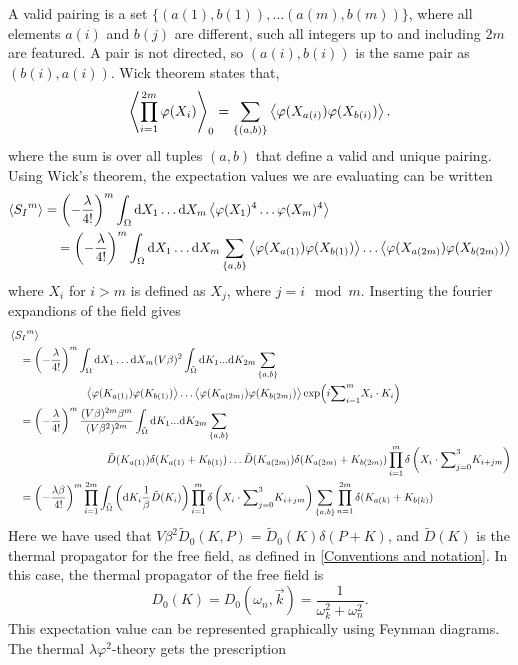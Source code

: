 A valid pairing is a set $\{(a(1), b(1)), \dots (a(m), b(m))\}$, where all elements $a(i)$ and $b(j)$ are different, such all integers up to and including $2m$ are featured.
A pair is not directed, so $(a(i), b(i))$ is the same pair as $(b(i), a(i))$.
Wick theorem states that,
\begin{equation}
    \ex{\prod_{i=1}^{2m} \varphi(X_i)  }_0
    = \sum_{\{(a, b)\}} \ex{\varphi(X_{a(i)}) \varphi(X_{b(i)})}.
\end{equation}
where the  sum is over all tuples $(a, b)$ that define a valid and unique pairing.
Using Wick's theorem, the expectation values we are evaluating can be written
\begin{align*}
    \ex{{S_I}^m} & 
    = \left(- \frac{\lambda }{4!}\right)^m 
    \int_{\Omega} \dd X_1 \dots \dd X_m
    \ex{\varphi(X_1)^4 \dots \varphi(X_m)^4} \\ 
    & \quad
    = \left(- \frac{\lambda }{4!}\right)^m 
    \int_{\Omega} \dd X_1 \dots \dd X_m \sum_{\{a, b\}}
    \ex{\varphi(X_{a(1)}) \varphi(X_{b(1)})} 
    \dots
    \ex{\varphi(X_{a(2m)}) \varphi(X_{b(2m)})}
\end{align*}
where $X_i$ for $i>m$ is defined as $X_j$, where $j = i \mod m$.
Inserting the fourier expandions of the field gives
\begin{align*}
    & \ex{{S_I}^m} \\ 
    &\quad 
    = \left(-\frac{\lambda }{4!}\right)^m 
    \int_{\Omega} \dd X_1 \dots \dd X_m
    (V \beta)^2 \int_{\tilde \Omega} \dd K_1 ... \dd K_{2m} \sum_{\{a, b\}} \\
    & \quad \quad \quad \quad\quad \quad \quad
    \ex{\varphi(K_{a(1)}) \varphi(K_{b(1)})} 
    \dots
    \ex{\varphi(K_{a(2m)}) \varphi(K_{b(2m)})}     
    \exp(i {\sum}_{i=1}^{m} X_i \cdot K_i)\\ 
    & \quad  
    = \left(-\frac{\lambda }{4!}\right)^m 
    \frac{(V \beta)^{2m} \beta^m}{(V \beta^2)^{2m}}
    \int_{\tilde \Omega} \dd K_1 ... \dd K_{2m} \sum_{\{a, b\}} \\
    & \quad \quad \quad \quad \quad \quad \quad \quad \quad
    \tilde D(K_{a(1)}) \delta(K_{a(1)} + K_{b(1)}) \dots 
    \tilde D(K_{a(2m)}) \delta(K_{a(2m)} + K_{b(2m)})
    \prod_{i=1}^m \delta\left(X_i \cdot {\sum}_{j=0}^3 K_{i + jm}\right) \\
    & \quad 
    = \left(-\frac{\lambda \beta}{4!}\right)^m 
    \prod_{i=1}^{2m} \int_{\tilde \Omega} 
    \left( \dd K_i \frac{1}{\beta} \tilde D(K_i)  \right) 
    \prod_{i=1}^m \delta\left(X_i \cdot {\sum}_{j=0}^3 K_{i + jm}\right)
    \sum_{\{a, b\}} 
    \prod_{n=1}^{2m}\delta(K_{a(k)} + K_{b(k)})
\end{align*}
Here we have used that $V \beta^2 \tilde D_0(K, P) = \tilde D_0(K) \delta(P + K)$, and $\tilde D(K)$ is the thermal propagator for the free field, as defined in \autoref{Conventions and notation}.
In this case, the thermal propagator of the free field is
\begin{equation}
    D_0(K) = D_0(\omega_n, \vec k) = \frac{1}{\omega_k^2 + \omega_n^2}.
\end{equation}
This expectation value can be represented graphically using Feynman diagrams.
The thermal $\lambda \varphi^2$-theory gets the prescription


